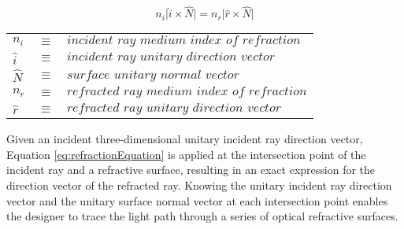 \begin{table}			%
\centering
\begin{equation}		%
n_i\vert\hat{i}\times\hat{N}\vert  = n_r\vert\hat{r}\times\hat{N}\vert 
\label{eq:refractionEquation}
\end{equation}
\begin{tabular}{lll}
$n_i$        & $\equiv$ & $\textit{incident ray medium index of refraction}  $\\
$\hat{i}$  & $\equiv$ & $\textit{incident ray unitary direction vector}        $\\
$\hat{N}$ & $\equiv$ & $\textit{surface unitary normal vector}                    $\\
$n_r$         & $\equiv$ & $\textit{refracted ray medium index of refraction}$\\
$\hat{r}$  & $\equiv$ & $\textit{refracted ray unitary direction vector}       $
\end{tabular}
\end{table}

Given an incident three-dimensional unitary incident ray direction vector, Equation \eqref{eq:refractionEquation} is applied at the intersection point of the incident ray and a refractive surface, resulting in an exact expression for the direction vector of the refracted ray. Knowing the unitary incident ray direction vector and the unitary surface normal vector at each intersection point enables the designer to trace the light path through a series of optical refractive surfaces.




